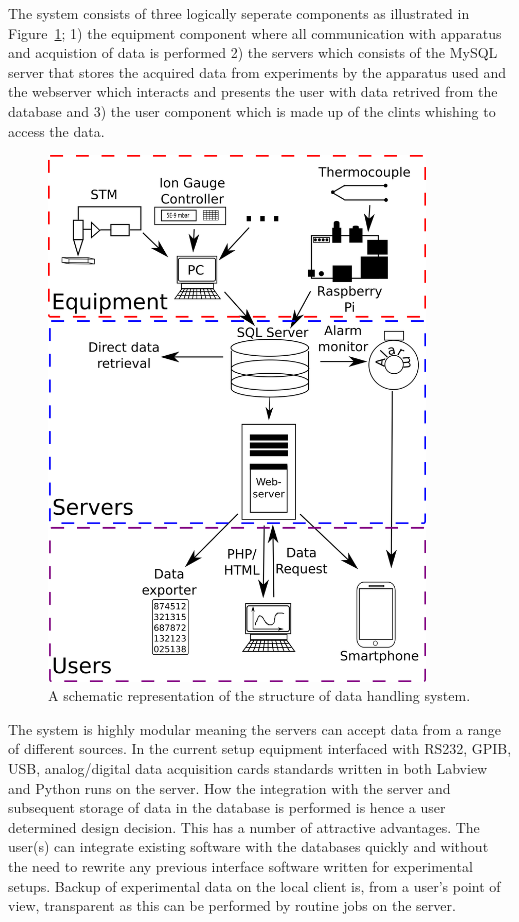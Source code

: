 The system consists of three logically seperate components as illustrated in
Figure~\ref{fig:system_overview}; 1) the equipment component where all
communication with apparatus and acquistion of data is performed 2) the servers
which consists of the MySQL server that stores the acquired data from
experiments by the apparatus used and the webserver which interacts and
presents the user with data retrived from the database and 3) the user
component which is made up of the clints whishing to access the data.
\begin{figure}
 \begin{center}
 \includegraphics[width=10cm]{system_overview.png}
 \caption{
   A schematic representation of the structure of data handling system.
   \label{fig:system_overview}
 } 
 \end{center}
\end{figure}

The system is highly modular meaning the servers can accept data from a range
of different sources. In the current setup equipment interfaced with RS232,
GPIB, USB, analog/digital data acquisition cards standards written in both
Labview and Python runs on the server. How the integration with the server and
subsequent storage of data in the database is performed is hence a user
determined design decision. This has a number of attractive advantages. The
user(s) can integrate existing software with the databases quickly and without
the need to rewrite any previous interface software written for experimental
setups. Backup of experimental data on the local client is, from a user's point
of view, transparent as this can be performed by routine jobs on the server.

